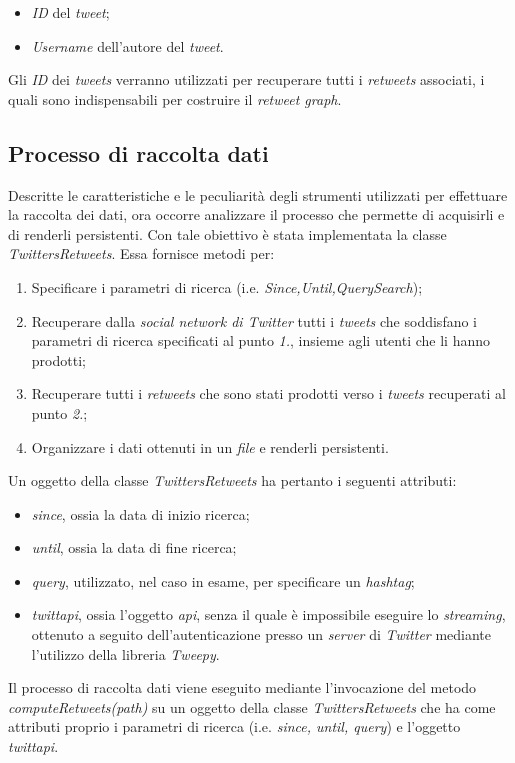 \begin{itemize}
\item \textit{ID} del \textit{tweet};
\item \textit{Username} dell'autore del \textit{tweet}.
\end{itemize}
Gli \textit{ID} dei \textit{tweets} verranno utilizzati per recuperare tutti i \textit{retweets} associati, i quali sono indispensabili per costruire il \textit{retweet graph}.

\subsection{Processo di raccolta dati}
Descritte le caratteristiche e le peculiarità degli strumenti utilizzati per effettuare la raccolta dei dati, ora occorre analizzare il processo che permette di acquisirli e di renderli persistenti. Con tale obiettivo è stata implementata la classe \textit{TwittersRetweets}. Essa fornisce metodi per: 
\begin{enumerate}
\item Specificare i parametri di ricerca (i.e. \textit{Since,Until,QuerySearch}); 
\item Recuperare dalla \textit{social network di Twitter} tutti i \textit{tweets} che soddisfano i parametri di ricerca specificati al punto \textit{1.}, insieme agli utenti che li hanno prodotti; 
\item Recuperare tutti i \textit{retweets} che sono stati prodotti verso i \textit{tweets} recuperati al punto \textit{2.};
\item Organizzare i dati ottenuti in un \textit{file} e renderli persistenti.
\end{enumerate}
Un oggetto della classe \textit{TwittersRetweets} ha pertanto i seguenti attributi:
\begin{itemize}
\item \textit{since}, ossia la data di inizio ricerca; 
\item \textit{until}, ossia la data di fine ricerca;
\item \textit{query}, utilizzato, nel caso in esame, per specificare un \textit{hashtag};
\item \textit{twittapi}, ossia l'oggetto \textit{api}, senza il quale è impossibile eseguire lo \textit{streaming}, ottenuto a seguito dell'autenticazione presso un \textit{server} di \textit{Twitter} mediante l'utilizzo della libreria \textit{Tweepy}.
\end{itemize}
Il processo di raccolta dati viene eseguito mediante l'invocazione del metodo \textit{computeRetweets(path)} su un oggetto della classe \textit{TwittersRetweets} che ha come attributi proprio i parametri di ricerca (i.e. \textit{since, until, query}) e l'oggetto \textit{twittapi}.
